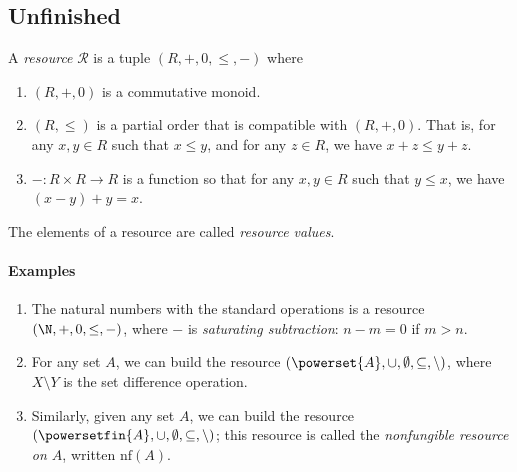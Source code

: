 \documentclass[10pt]{article}
\begin{document}
\subsection{Unfinished}
\begin{definition}
    A \emph{resource} $\mathcal{R}$ is a tuple $(R, +, 0, \leq, -)$ where
    \begin{enumerate}[label=(\roman*)]
        \item $(R, +, 0)$ is a commutative monoid.
        \item $(R, \leq)$ is a partial order that is compatible with $(R, +, 0)$.
            That is, for any $x, y \in R$ such that $x \leq y$, and for any $z \in R$, we have $x + z \leq y + z$.
        \item $- : R \times R \to R$ is a function so that for any $x,y \in R$ such that $y \leq x$, we have $(x - y) + y = x$.

    \end{enumerate}
    The elements of a resource are called \emph{resource values}.
\end{definition}

\paragraph{Examples}

\begin{enumerate}
    \item The natural numbers with the standard operations is a resource $(\N, +, 0, \leq, -)$, where $-$ is \emph{saturating subtraction}: $n - m = 0$ if $m > n$.
    \item For any set $A$, we can build the resource $(\powerset{A}, \cup, \emptyset, \subseteq, \setminus)$, where $X \setminus Y$ is the set difference operation.
    \item Similarly, given any set $A$, we can build the resource $(\powersetfin{A}, \cup, \emptyset, \subseteq, \setminus)$; this resource is called the \emph{nonfungible resource on $A$}, written $\text{nf}(A)$.
\end{enumerate}
\end{document}
